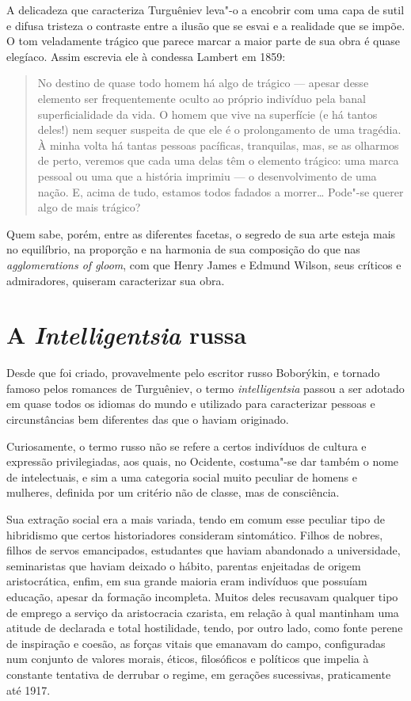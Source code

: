 A delicadeza que caracteriza Turguêniev leva"-o a encobrir com uma capa
de sutil e difusa tristeza o contraste entre a ilusão que se esvai e a
realidade que se impõe. O tom veladamente trágico que parece marcar a
maior parte de sua obra é quase elegíaco. Assim escrevia ele à condessa
Lambert em 1859:

\begin{quote}
No destino de quase todo homem há algo de trágico --- apesar desse
elemento ser frequentemente oculto ao próprio indivíduo pela banal
superficialidade da vida. O homem que vive na superfície (e há tantos
deles!) nem sequer suspeita de que ele é o prolongamento de uma
tragédia. À minha volta há tantas pessoas pacíficas, tranquilas, mas, se as
olharmos de perto, veremos que cada uma delas têm o elemento trágico: uma
marca pessoal ou uma que a história imprimiu --- o desenvolvimento de uma
nação. E, acima de tudo, estamos todos fadados a morrer\ldots{} Pode"-se
querer algo de mais trágico?
\end{quote}

Quem sabe, porém, entre as diferentes facetas, o segredo de sua arte esteja mais no
equilíbrio, na proporção e na harmonia de sua composição do que nas
\emph{agglomerations of gloom}, com que Henry James e Edmund Wilson, seus
críticos e admiradores, quiseram caracterizar sua obra.

\section{A \emph{Intelligentsia} russa}

Desde que foi criado, provavelmente pelo escritor russo Boborýkin, e tornado
famoso pelos romances de Turguêniev, o termo \emph{intelligentsia}
passou a ser adotado em quase todos os idiomas do mundo e utilizado para
caracterizar pessoas e circunstâncias bem diferentes das que o haviam
originado.

Curiosamente, o termo russo não se refere a certos indivíduos de cultura
e expressão privilegiadas, aos quais, no Ocidente, costuma"-se dar também
o nome de intelectuais, e sim a uma categoria social muito peculiar de
homens e mulheres, definida por um critério não de classe, mas de
consciência.

Sua extração social era a mais variada, tendo em comum esse peculiar
tipo de hibridismo que certos historiadores consideram sintomático.
Filhos de nobres, filhos de servos emancipados, estudantes que haviam
abandonado a universidade, seminaristas que haviam deixado o hábito,
parentas enjeitadas de origem aristocrática, enfim, em sua grande maioria eram
indivíduos que possuíam educação, apesar da formação incompleta.
Muitos deles recusavam qualquer tipo de emprego a serviço da
aristocracia czarista, em relação à qual mantinham uma atitude de
declarada e total hostilidade, tendo, por outro lado, como fonte perene
de inspiração e coesão, as forças vitais que emanavam do campo,
configuradas num conjunto de valores morais, éticos, filosóficos e
políticos que impelia à constante tentativa de derrubar o regime, em
gerações sucessivas, praticamente até 1917.

